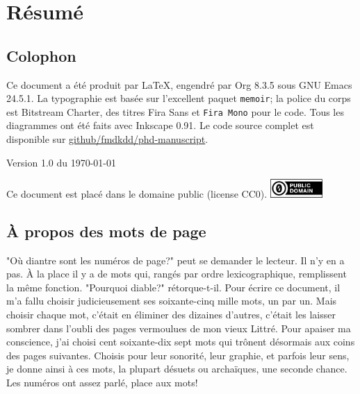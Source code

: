 \cleartorecto
\section*{Résumé}


\cleartorecto
\phantom{a}                     %
\vspace{13cm}
\subsection*{Colophon}
Ce document a été produit par \LaTeX{}, engendré par Org 8.3.5 sous GNU Emacs
24.5.1.  La typographie est basée sur l'excellent paquet \texttt{memoir}; la
police du corps est Bitstream Charter, des titres \textsf{Fira Sans}
et \texttt{Fira Mono} pour le code.  Tous les diagrammes ont été faits avec
Inkscape 0.91.  Le code source complet est disponible sur
\href{https://github.com/fmdkdd/phd-manuscript}{github/fmdkdd/phd-manuscript}.

\vfill
\begin{center}
Version 1.0 du \today
\end{center}

\vfill
\begin{center}
Ce document est placé dans le domaine public (license CC0).
\includegraphics[width=2cm]{img/cc-zero.png}
\end{center}

\cleartoverso
{}
\tableofcontents*

\vfill

\begin{minipage}{0.8\textwidth}
\subsection*{À propos des mots de page}
"Où diantre sont les numéros de page?" peut se demander le lecteur.  Il n'y en a
pas.  À la place il y a de mots qui, rangés par ordre lexicographique,
remplissent la même fonction.  "Pourquoi diable?" rétorque-t-il.  Pour écrire ce
document, il m'a fallu choisir judicieusement ses soixante-cinq mille mots, un
par un.  Mais choisir chaque mot, c'était en éliminer des dizaines d'autres,
c'était les laisser sombrer dans l'oubli des pages vermoulues de mon vieux
Littré.  Pour apaiser ma conscience, j'ai choisi cent soixante-dix sept mots qui
trônent désormais aux coins des pages suivantes.  Choisis pour leur sonorité,
leur graphie, et parfois leur sens, je donne ainsi à ces mots, la plupart
désuets ou archaïques, une seconde chance.  Les numéros ont assez parlé, place
aux mots!
\end{minipage}

